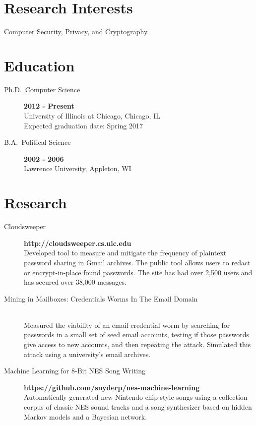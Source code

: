 \documentclass{vitae}
\author{Peter Snyder}
\begin{document}
  \maketitle

  \section{Research Interests}
  \begin{description}
    \item{Computer Security, Privacy, and Cryptography.}
  \end{description}

  \section{Education}
  \begin{description}
    \item[Ph.D.~Computer Science] \hfill \textbf{2012 - Present}\\
    University of Illinois at Chicago, Chicago, IL\\
    Expected graduation date: Spring 2017

    \item[B.A.~Political Science] \hfill \textbf{2002 - 2006}~\\
    Lawrence University, Appleton, WI
  \end{description}

  
    \nocite{cscodaspy}
    \nocite{csgcasr}
    \nocite{cloudsweeper}
  

  \section{Research}
  \begin{description}
    \item[Cloudsweeper] \hfill \textbf{http://cloudsweeper.cs.uic.edu}\\
    Developed tool to measure and mitigate the frequency of plaintext password sharing in Gmail archives. The public tool allows users to redact or encrypt-in-place found passwords. The site has had over 2,500 users and has secured over 38,000 messages.

    \item[Mining in Mailboxes: Credentials Worms In The Email Domain] ~\\
    Measured the viability of an email credential worm by searching for passwords in a small set of seed email accounts, testing if those passwords give access to new accounts, and then repeating the attack. Simulated this attack using a university's email archives.

    \item[Machine Learning for 8-Bit NES Song Writing] \hfill \textbf{https://github.com/snyderp/nes-machine-learning}\\
    Automatically generated new Nintendo chip-style songs using a collection corpus of classic NES sound tracks and a song synthesizer based on hidden Markov models and a Bayesian network.
  \end{description}
\end{document}
